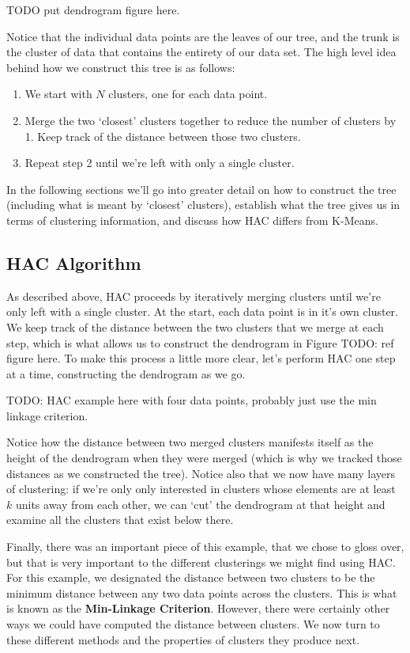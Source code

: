 TODO put dendrogram figure here.

Notice that the individual data points are the leaves of our tree, and the trunk is the cluster of data that contains the entirety of our data set. The high level idea behind how we construct this tree is as follows:

\begin{enumerate}
    \item We start with $N$ clusters, one for each data point.
    \item Merge the two `closest' clusters together to reduce the number of clusters by 1. Keep track of the distance between those two clusters.
    \item Repeat step 2 until we're left with only a single cluster.
\end{enumerate}

In the following sections we'll go into greater detail on how to construct the tree (including what is meant by `closest' clusters), establish what the tree gives us in terms of clustering information, and discuss how HAC differs from K-Means.

\subsection{HAC Algorithm}
As described above, HAC proceeds by iteratively merging clusters until we're only left with a single cluster. At the start, each data point is in it's own cluster. We keep track of the distance between the two clusters that we merge at each step, which is what allows us to construct the dendrogram in Figure TODO: ref figure here. To make this process a little more clear, let's perform HAC one step at a time, constructing the dendrogram as we go.

TODO: HAC example here with four data points, probably just use the min linkage criterion.

Notice how the distance between two merged clusters manifests itself as the height of the dendrogram when they were merged (which is why we tracked those distances as we constructed the tree). Notice also that we now have many layers of clustering: if we're only only interested in clusters whose elements are at least $k$ units away from each other, we can `cut' the dendrogram at that height and examine all the clusters that exist below there.

Finally, there was an important piece of this example, that we chose to gloss over, but that is very important to the different clusterings we might find using HAC. For this example, we designated the distance between two clusters to be the minimum distance between any two data points across the clusters. This is what is known as the \textbf{Min-Linkage Criterion}. However, there were certainly other ways we could have computed the distance between clusters. We now turn to these different methods and the properties of clusters they produce next.

